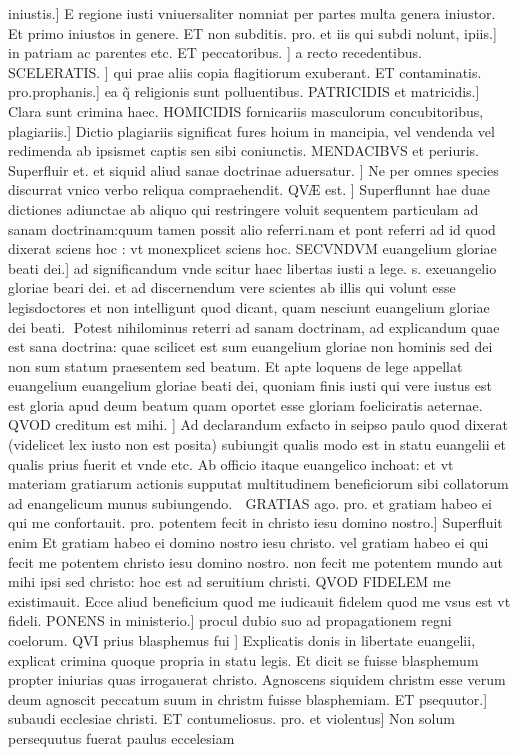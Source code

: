\documentclass{article}
\begin{document}
\begin{pages}
iniustis.] E regione iusti vniuersaliter nomniat per partes multa genera iniustor. Et primo iniustos in genere. ET non subditis. pro. et iis qui subdi nolunt, ipiis.] in patriam ac parentes etc. ET peccatoribus. ] a recto recedentibus. SCELERATIS. ] qui prae aliis copia flagitiorum exuberant. ET contaminatis. pro.prophanis.] ea q̃ religionis sunt polluentibus. PATRICIDIS et matricidis.] Clara sunt crimina haec. HOMICIDIS fornicariis  masculorum concubitoribus, plagiariis.] Dictio plagiariis significat fures hoium in mancipia, vel vendenda vel redimenda ab ipsismet captis sen sibi coniunctis. MENDACIBVS et periuris. Superfluir et. et siquid aliud sanae doctrinae aduersatur. ] Ne per omnes species discurrat vnico verbo reliqua compraehendit. QVÆ est. ] Superflunnt hae duae dictiones adiunctae ab aliquo qui restringere voluit sequentem particulam ad sanam doctrinam:quum tamen possit alio referri.nam et pont referri ad id quod dixerat sciens hoc : vt monexplicet sciens hoc. SECVNDVM euangelium gloriae beati dei.] ad significandum vnde scitur haec libertas iusti a lege. s. exeuangelio gloriae beari dei. et ad discernendum vere scientes ab illis qui volunt esse legisdoctores et non intelligunt quod dicant, quam nesciunt euangelium gloriae dei beati. Potest nihilominus reterri ad sanam doctrinam, ad explicandum quae est sana doctrina: quae scilicet est sum euangelium gloriae non hominis sed dei non sum statum praesentem sed beatum. Et apte loquens de lege appellat euangelium euangelium gloriae beati dei, quoniam finis iusti qui vere iustus est est gloria apud deum beatum quam oportet esse gloriam foeliciratis aeternae. QVOD creditum est mihi. ] Ad declarandum exfacto in seipso paulo quod dixerat (videlicet lex iusto non est posita) subiungit qualis modo est in statu euangelii et qualis prius fuerit et vnde etc. Ab officio itaque euangelico inchoat: et vt materiam gratiarum actionis supputat multitudinem beneficiorum sibi collatorum ad enangelicum munus subiungendo.  GRATIAS ago. pro. et gratiam habeo ei qui me confortauit. pro. potentem fecit in christo iesu domino nostro.] Superfluit enim Et gratiam habeo ei domino nostro iesu christo. vel gratiam habeo ei qui fecit me potentem christo iesu domino nostro. non fecit me potentem mundo aut mihi ipsi sed christo: hoc est ad seruitium christi. QVOD FIDELEM me existimauit. Ecce aliud beneficium quod me iudicauit fidelem quod me vsus est vt fideli. PONENS in ministerio.] procul dubio suo ad propagationem regni coelorum. QVI prius blasphemus fui ] Explicatis donis in libertate euangelii, explicat crimina quoque propria in statu legis. Et dicit se fuisse blasphemum propter iniurias quas irrogauerat christo. Agnoscens siquidem christm esse verum deum agnoscit peccatum suum in christm fuisse blasphemiam. ET psequutor.] subaudi ecclesiae christi. ET contumeliosus. pro. et violentus] Non solum persequutus fuerat paulus eccelesiam  \pend

\end{pages}
\end{document}
